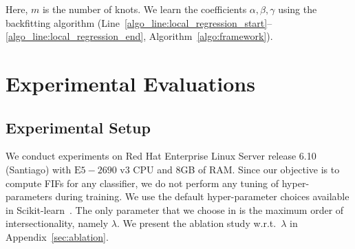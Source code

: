 Here, $ m $ is the number of knots. We learn the coefficients $ \alpha, \beta, \gamma $ using the backfitting algorithm (Line~\ref{algo_line:local_regression_start}--\ref{algo_line:local_regression_end}, Algorithm~\ref{algo:framework}). 

\begin{comment}
\paragraph{Kernel Smoothing.}
Kernel smoother estimates a real-valued function $ \function : \mathbb{R}^k \rightarrow \mathbb{R} $ as the weighted average of neighboring observed data. The weight is defined by the kernel such that closer points are given higher weights. The estimated function is smooth, where the level of smoothness is specified by a single parameter. Let $ k_{h_\lambda}(\mathbf{X}_0, \mathbf{X}) $ be a kernel defined by
\[
k_{h_\lambda}(\mathbf{X}_0, \mathbf{X}) = D\Big(\frac{||\mathbf{X}_0, \mathbf{X}||}{h_\lambda(\mathbf{X}_0)}\Big)
\]

where: 
\begin{itemize}
	\item $ \mathbf{X}_0, \mathbf{X} \in \mathbb{R}^k $
	\item $ ||\cdot|| $ is Euclidean norm
	\item $ h_\lambda(\mathbf{X}_0) $ is a parameter known as kernel radius
	\item $ D(t) $ is a positive real-valued function, whose value is decreasing (or not increasing) for the increasing distance $ t $
\end{itemize}
Popular kernels used for smoothing include parabolic, tricube, and Gaussian kernels. Popular kernel smoothers are Gaussian kernel smoother, nearest neighbor smoother, kernel average smoother, local linear or polynomial regression.

\end{comment}

\section{Experimental Evaluations}\label{sec:additional_experiments}


\subsection{Experimental Setup}
We conduct experiments on Red Hat Enterprise Linux Server release 6.10 (Santiago) with $ \text{E}5-2690 \text{ v}3 $ CPU and $ 8 $GB of RAM. Since our objective is to compute FIFs for any classifier, we do not perform any tuning of hyper-parameters during training. We use the default hyper-parameter choices available in Scikit-learn~\cite{scikit-learn}. The only parameter that we choose in {\framework} is the maximum order of intersectionality, namely $ \lambda $. We present the ablation study w.r.t.\ $ \lambda $ in Appendix~\ref{sec:ablation}.


